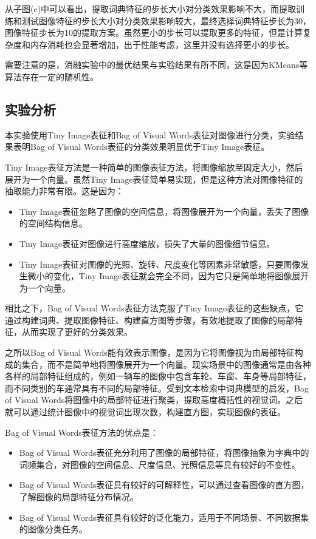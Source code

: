 从子图(c)中可以看出，提取词典特征的步长大小对分类效果影响不大，而提取训练和测试图像特征的步长大小对分类效果影响较大，最终选择词典特征步长为30，图像特征步长为10的提取方案。虽然更小的步长可以提取更多的特征，但是计算复杂度和内存消耗也会显著增加，出于性能考虑，这里并没有选择更小的步长。

需要注意的是，消融实验中的最优结果与实验结果有所不同，这是因为KMeans等算法存在一定的随机性。

\subsection{实验分析}

本实验使用Tiny Image表征和Bag of Visual Words表征对图像进行分类，实验结果表明Bag of Visual Words表征的分类效果明显优于Tiny Image表征。

Tiny Image表征方法是一种简单的图像表征方法，将图像缩放至固定大小，然后展开为一个向量。虽然Tiny Image表征简单易实现，但是这种方法对图像特征的抽取能力非常有限。这是因为：

\begin{itemize}
    \item Tiny Image表征忽略了图像的空间信息，将图像展开为一个向量，丢失了图像的空间结构信息。
    \item Tiny Image表征对图像进行高度缩放，损失了大量的图像细节信息。
    \item Tiny Image表征对图像的光照、旋转、尺度变化等因素非常敏感，只要图像发生微小的变化，Tiny Image表征就会完全不同，因为它只是简单地将图像展开为一个向量。
\end{itemize}

相比之下，Bag of Visual Words表征方法克服了Tiny Image表征的这些缺点，它通过构建词典、提取图像特征、构建直方图等步骤，有效地提取了图像的局部特征，从而实现了更好的分类效果。

之所以Bag of Visual Words能有效表示图像，是因为它将图像视为由局部特征构成的集合，而不是简单地将图像展开为一个向量。现实场景中的图像通常是由各种各样的局部特征组成的，例如一辆车的图像中包含车轮、车窗、车身等局部特征，而不同类别的车通常具有不同的局部特征。受到文本检索中词典模型的启发，Bag of Visual Words将图像中的局部特征进行聚类，提取高度概括性的视觉词。之后就可以通过统计图像中的视觉词出现次数，构建直方图，实现图像的表征。

Bag of Visual Words表征方法的优点是：

\begin{itemize}
    \item Bag of Visual Words表征充分利用了图像的局部特征，将图像抽象为字典中的词频集合，对图像的空间信息、尺度信息、光照信息等具有较好的不变性。
    \item Bag of Visual Words表征具有较好的可解释性，可以通过查看图像的直方图，了解图像的局部特征分布情况。
    \item Bag of Visual Words表征具有较好的泛化能力，适用于不同场景、不同数据集的图像分类任务。
\end{itemize}


